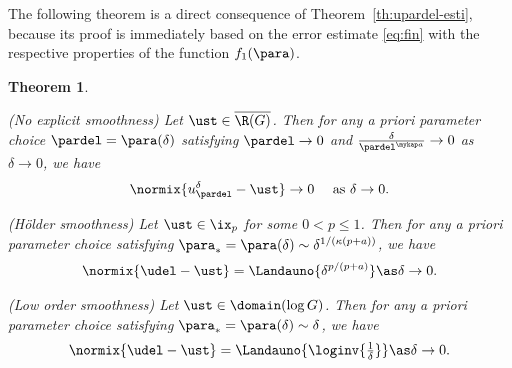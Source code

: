 \documentclass[10pt]{article}
\newtheorem{theorem}{Theorem}
\theoremstyle{definition}
\begin{document}
The following theorem is a direct consequence of Theorem~\ref{th:upardel-esti}, because its proof is immediately based on the error estimate \eqref{eq:fin} with the respective properties
of the function $f_1(\para)$.


\begin{theorem}
\label{th:apriori}
\mainassump
\begin{mylist}
\item (No explicit smoothness)
Let $ \ust \in \overline{\R(G)} $. Then for any a priori parameter choice
$\pardel=\para(\delta)$
satisfying
%
$ \pardel \to 0 $ and $ \tfrac{\delta}{\pardel^{\mykap a}} \to 0 $ as $ \delta \to 0 $,
%
we have
$$ \normix{u_{\pardel}^\delta-\ust} \to 0 \quad \textup{ as } \delta \to 0.
$$
%

\item (H\"older smoothness)
Let $ \ust \in \ix_p $ for some $ 0 < p \le 1 $.
Then for any a priori parameter choice satisfying
$ \para_*=\para(\delta) \sim  \delta^{1/(\kappa(p+a))} $,
we have
%
\begin{align*}
\normix{\udel -\ust} = \Landauno{\delta^{p/(p+a)}} \as \delta \to 0.
\end{align*}
%
\item (Low order smoothness)
Let $ \ust \in \domain(\log G) $.
Then for any a priori parameter choice satisfying
$ \para_*=\para(\delta) \sim \delta $, we have
%
\begin{align*}
\normix{\udel -\ust} = \Landauno{\loginv{\tfrac{1}{\delta}}} \as \delta \to 0.
\end{align*}
\end{mylist}
\end{theorem}
%
\end{document}
